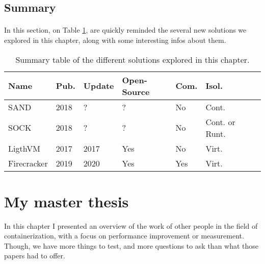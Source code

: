 \subsection{Summary}
\paragraph{}In this section, on Table \ref{tab:summary}, are quickly reminded the several new solutions we explored in this chapter, along with some interesting infos about them.
\begin{table}[!h]

  \begin{center}
    \begin{tabular}{|p{}|p{}|p{}|p{}|p{}|p{}|p{}|}
       \hline
       \textbf{Name} & \textbf{Pub.}\footnotemark & \textbf{Update}\footnotemark & \textbf{Open-Source} & \textbf{Com.}\footnotemark & \textbf{Isol.}\footnotemark \\
       \hline
       SAND\cite{akkus2018sand} & 2018 & ? & ? & No & Cont. \\
       \hline
       SOCK\cite{oakes2018sock} & 2018 & ? & ? & No & Cont. or Runt. \\
       \hline
       LigthVM\cite{manco2017my} & 2017 & 2017 & Yes & No & Virt. \\
       \hline
       Firecracker\cite{agachefirecracker} & 2019 & 2020 & Yes & Yes & Virt.\\
       \hline
    \end{tabular}
  \end{center}
  \caption{Summary table of the different solutions explored in this chapter.}
  \label{tab:summary}
\end{table}

\section{My master thesis}
In this chapter I presented an overview of the work of other people in the field of containerization, with a focus on performance improvement or measurement.  Though, we have more things to test, and more questions to ask than what those papers had to offer.


